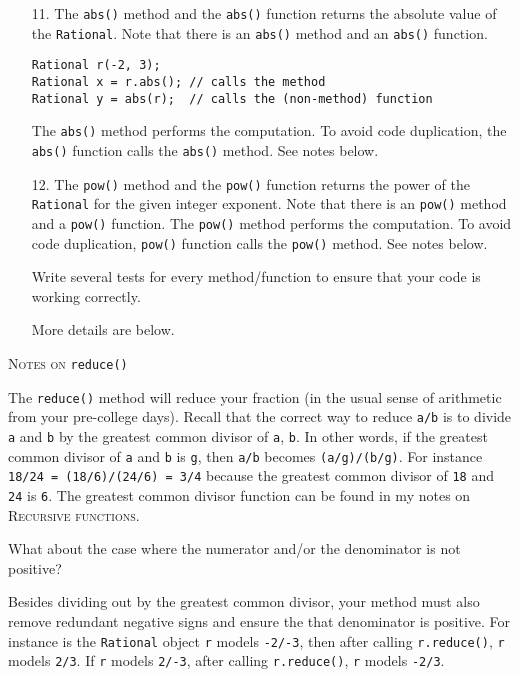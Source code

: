 \begin{itemize}
\item[11.]
The \texttt{abs()} method and the \texttt{abs()} function returns the
absolute value of the \texttt{Rational}.
Note that there is an \texttt{abs()} method and an \texttt{abs()} function.
\begin{Verbatim}[frame=single,commandchars=\\\{\}]
Rational r(-2, 3);
Rational x = r.abs(); // calls the method 
Rational y = abs(r);  // calls the (non-method) function
\end{Verbatim}
The \texttt{abs()} method performs the computation.
To avoid code duplication, the \texttt{abs()} function calls the
\texttt{abs()} method. See notes below.

\item[12.]
The \texttt{pow()} method and the
\texttt{pow()} function returns the power of the \texttt{Rational}
for the given integer exponent.
Note that there is an \texttt{pow()} method and a \texttt{pow()} function.
The \texttt{pow()} method performs the computation.
To avoid code duplication, \texttt{pow()} function calls the
\texttt{pow()} method. See notes below.

Write several tests for every method/function to ensure that your code is
working correctly.

More details are below.

\end{itemize}



\newpage
\textsc{Notes on} {\texttt{reduce()}}

The \texttt{reduce()} method will reduce your fraction
(in the usual sense of arithmetic from your pre-college days).
Recall that the correct way to reduce \texttt{a/b} is to divide \texttt{a}
and \texttt{b} by the greatest common divisor of \texttt{a}, \texttt{b}.
In other words, if the greatest common divisor of \texttt{a}
and \texttt{b} is \texttt{g}, then \texttt{a/b} becomes
\texttt{(a/g)/(b/g)}.
For instance \texttt{18/24 = (18/6)/(24/6) = 3/4}
because the greatest common divisor of \texttt{18} and \texttt{24} is
\texttt{6}.
The greatest common divisor function can be found in
my notes on \textsc{Recursive functions}.

What about the case where the numerator and/or the denominator is not positive?

Besides dividing out by the greatest common divisor,
your method must also remove redundant negative signs and ensure the
that denominator is positive.
For instance is the \texttt{Rational} object \texttt{r} models
\texttt{-2/-3}, then after calling \texttt{r.reduce()},
\texttt{r} models \texttt{2/3}.
If \texttt{r} models \texttt{2/-3}, after calling
\texttt{r.reduce()}, \texttt{r} models \texttt{-2/3}.

